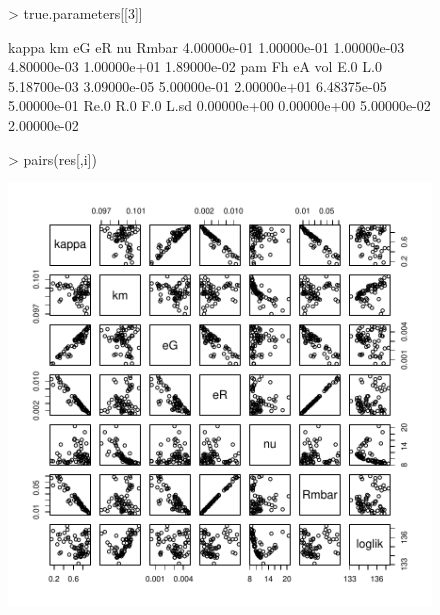 \documentclass[12pt,reqno,final]{amsart}
\theoremstyle{plain}
\numberwithin{equation}{part}
\begin{document}
\begin{figure}
\begin{Schunk}
\begin{Sinput}
> true.parameters[[3]]
\end{Sinput}
\begin{Soutput}
      kappa          km          eG          eR          nu       Rmbar 
4.00000e-01 1.00000e-01 1.00000e-03 4.80000e-03 1.00000e+01 1.89000e-02 
        pam          Fh          eA         vol         E.0         L.0 
5.18700e-03 3.09000e-05 5.00000e-01 2.00000e+01 6.48375e-05 5.00000e-01 
       Re.0         R.0         F.0        L.sd 
0.00000e+00 0.00000e+00 5.00000e-02 2.00000e-02 
\end{Soutput}
\begin{Sinput}
> pairs(res[,i])
\end{Sinput}
\end{Schunk}
\includegraphics{Correlation_among_parameters-006}
\end{figure}
\end{document}
